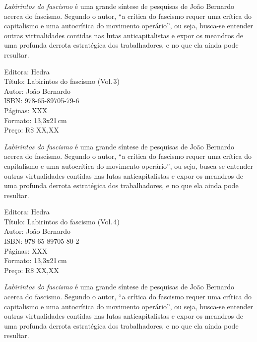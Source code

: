 \noindent{}\textit{Labirintos do fascismo} é uma grande síntese de pesquisas de João Bernardo acerca do fascismo. Segundo o autor, ``a crítica do fascismo requer uma crítica do capitalismo e uma autocrítica do movimento operário'', ou seja, busca-se entender outras virtualidades contidas nas lutas anticapitalistas e expor os meandros de uma profunda derrota estratégica dos trabalhadores, e no que ela ainda pode resultar. %

\begin{ficha}
Editora: Hedra\\
Título: Labirintos do fascismo (Vol.\,3)\\
Autor: João Bernardo\\ 
ISBN: 978-65-89705-79-6\\
Páginas: XXX\\
Formato: 13,3x21\,cm\\
Preço: R\$ XX,XX\\
\end{ficha}

\pagebreak


\noindent{}\textit{Labirintos do fascismo} é uma grande síntese de pesquisas de João Bernardo acerca do fascismo. Segundo o autor, ``a crítica do fascismo requer uma crítica do capitalismo e uma autocrítica do movimento operário'', ou seja, busca-se entender outras virtualidades contidas nas lutas anticapitalistas e expor os meandros de uma profunda derrota estratégica dos trabalhadores, e no que ela ainda pode resultar. %

\begin{ficha}
Editora: Hedra\\
Título: Labirintos do fascismo (Vol.\,4)\\
Autor: João Bernardo\\ 
ISBN: 978-65-89705-80-2\\
Páginas: XXX\\
Formato: 13,3x21\,cm\\
Preço: R\$ XX,XX\\
\end{ficha}

\pagebreak


\noindent{}\textit{Labirintos do fascismo} é uma grande síntese de pesquisas de João Bernardo acerca do fascismo. Segundo o autor, ``a crítica do fascismo requer uma crítica do capitalismo e uma autocrítica do movimento operário'', ou seja, busca-se entender outras virtualidades contidas nas lutas anticapitalistas e expor os meandros de uma profunda derrota estratégica dos trabalhadores, e no que ela ainda pode resultar. %

